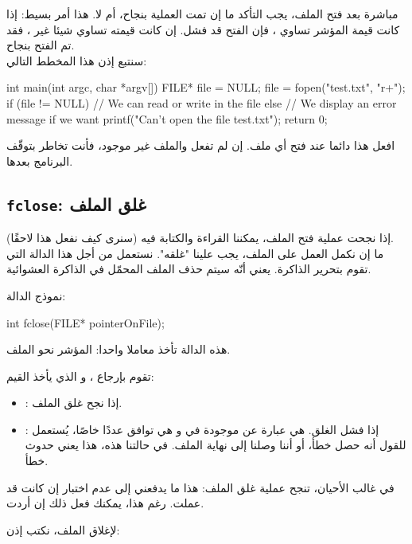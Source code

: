 مباشرة بعد فتح الملف، يجب التأكد ما إن تمت العملية بنجاح، أم لا. هذا أمر بسيط: إذا كانت قيمة المؤشر تساوي
،
فإن الفتح قد فشل. إن كانت قيمته تساوي شيئا غير
،
فقد تم الفتح بنجاح.\\
سنتبع إذن هذا المخطط التالي:

\begin{Csource}
int main(int argc, char *argv[])
{
	FILE* file = NULL;
	file = fopen("test.txt", "r+");
	if (file != NULL)
	{
    		// We can read or write in the file
	}
	else
	{
    		// We display an error message if we want
    		printf("Can't open the file test.txt");
	}
	return 0;
}
\end{Csource}

افعل هذا دائما عند فتح أي ملف. إن لم تفعل والملف غير موجود، فأنت تخاطر بتوقّف البرنامج بعدها.

\subsection{\texttt{fclose}: غلق الملف}

إذا نجحت عملية فتح الملف، يمكننا القراءة والكتابة فيه (سنرى كيف نفعل هذا لاحقًا).\\
ما إن نكمل العمل على الملف، يجب علينا "غلقه". نستعمل من أجل هذا الدالة
التي تقوم بتحرير الذاكرة. يعني أنّه سيتم حذف الملف المحمّل في الذاكرة العشوائية.

نموذج الدالة:

\begin{Csource}
int fclose(FILE* pointerOnFile);
\end{Csource}

هذه الدالة تأخذ معاملا واحدا: المؤشر نحو الملف.

تقوم بإرجاع
،
و الذي يأخذ القيم:

\begin{itemize}
  \item {}: إذا نجح غلق الملف.
  \item {}: إذا فشل الغلق.
هي عبارة عن
موجودة في
و هي توافق عددًا خاصًا، يُستعمل للقول أنه حصل خطأ، أو أننا وصلنا إلى نهاية الملف. في حالتنا هذه، هذا يعني حدوث خطأ.
\end{itemize}

في غالب الأحيان، تنجح عملية غلق الملف: هذا ما يدفعني إلى عدم اختبار إن كانت
قد عملت. رغم هذا، يمكنك فعل ذلك إن أردت.

لإغلاق الملف، نكتب إذن:

